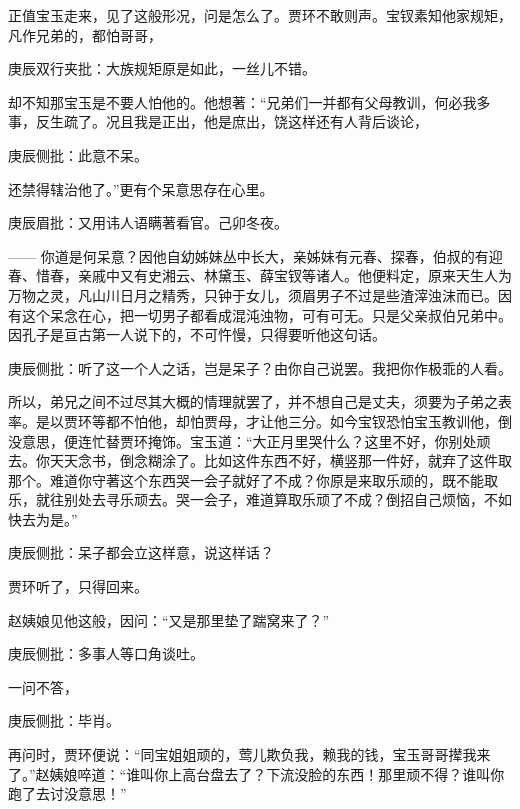 \begin{parag}
    正值宝玉走来，见了这般形况，问是怎么了。贾环不敢则声。宝钗素知他家规矩，凡作兄弟的，都怕哥哥，\begin{note}庚辰双行夹批：大族规矩原是如此，一丝儿不错。\end{note}却不知那宝玉是不要人怕他的。他想著：“兄弟们一并都有父母教训，何必我多事，反生疏了。况且我是正出，他是庶出，饶这样还有人背后谈论，\begin{note}庚辰侧批：此意不呆。\end{note}还禁得辖治他了。”更有个呆意思存在心里。\begin{note}庚辰眉批：又用讳人语瞒著看官。己卯冬夜。\end{note}—— 你道是何呆意？因他自幼姊妹丛中长大，亲姊妹有元春、探春，伯叔的有迎春、惜春，亲戚中又有史湘云、林黛玉、薛宝钗等诸人。他便料定，原来天生人为万物之灵，凡山川日月之精秀，只钟于女儿，须眉男子不过是些渣滓浊沫而已。因有这个呆念在心，把一切男子都看成混沌浊物，可有可无。只是父亲叔伯兄弟中。因孔子是亘古第一人说下的，不可忤慢，只得要听他这句话。\begin{note}庚辰侧批：听了这一个人之话，岂是呆子？由你自己说罢。我把你作极乖的人看。\end{note}所以，弟兄之间不过尽其大概的情理就罢了，并不想自己是丈夫，须要为子弟之表率。是以贾环等都不怕他，却怕贾母，才让他三分。如今宝钗恐怕宝玉教训他，倒没意思，便连忙替贾环掩饰。宝玉道：“大正月里哭什么？这里不好，你别处顽去。你天天念书，倒念糊涂了。比如这件东西不好，横竖那一件好，就弃了这件取那个。难道你守著这个东西哭一会子就好了不成？你原是来取乐顽的，既不能取乐，就往别处去寻乐顽去。哭一会子，难道算取乐顽了不成？倒招自己烦恼，不如快去为是。”\begin{note}庚辰侧批：呆子都会立这样意，说这样话？\end{note}贾环听了，只得回来。
\end{parag}


\begin{parag}
    赵姨娘见他这般，因问：“又是那里垫了踹窝来了？”\begin{note}庚辰侧批：多事人等口角谈吐。\end{note}一问不答，\begin{note}庚辰侧批：毕肖。\end{note}再问时，贾环便说：“同宝姐姐顽的，莺儿欺负我，赖我的钱，宝玉哥哥撵我来了。”赵姨娘啐道：“谁叫你上高台盘去了？下流没脸的东西！那里顽不得？谁叫你跑了去讨没意思！”
\end{parag}


